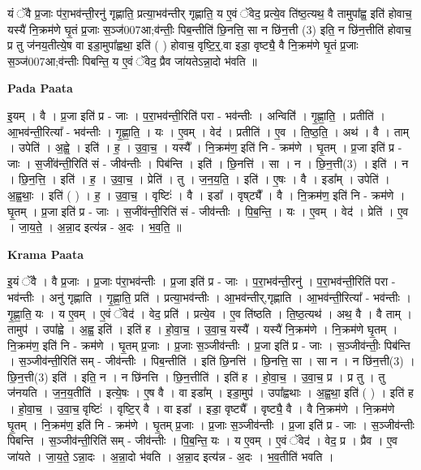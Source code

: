 \documentclass[17pt]{extarticle}
\begin{document}
यं ॅवै प्र॒जाः प॑रा॒भव॑न्ती॒रनु॑ गृह्णाति॒ प्रत्या॒भव॑न्तीर् गृह्णाति॒ य ए॒वं ॅवेद॒ प्रत्ये॒व ति॑ष्ठ॒त्यथ॒ वै तामुपा᳚ह्व॒ इति॑ होवाच॒ यस्यै॑ नि॒क्रम॑णे घृ॒तं प्र॒जाः स॒ञ्ज॑007आ;व॑न्तीः॒ पिब॒न्तीति॑ छि॒नत्ति॒ सा न छि॑न॒त्ती (3) इति॒ न छि॑न॒त्तीति॑ होवाच॒ प्र तु ज॑नय॒तीत्ये॒ष वा इडा॒मुपा᳚ह्वथा॒ इति॑ ( ) होवाच॒ वृष्टि॒र्॒.वा इडा॒ वृष्ट्यै॒ वै नि॒क्रम॑णे घृ॒तं प्र॒जाः स॒ञ्ज॑007आ;व॑न्तीः पिबन्ति॒ य ए॒वं ॅवेद॒ प्रैव जा॑यतेऽन्ना॒दो भ॑वति ॥ \newline

\textbf{Pada Paata} \newline

इ॒यम् । वै । प्र॒जा इति॑ प्र - जाः । प॒रा॒भव॑न्ती॒रिति॑ परा - भव॑न्तीः । अन्विति॑॑ । गृ॒ह्णा॒ति॒ । प्रतीति॑ । आ॒भव॑न्ती॒रित्या᳚ - भव॑न्तीः । गृ॒ह्णा॒ति॒ । यः । ए॒वम् । वेद॑ । प्रतीति॑ । ए॒व । ति॒ष्ठ॒ति॒ । अथ॑ । वै । ताम् । उपेति॑ । अ॒ह्वे॒ । इति॑ । ह॒ । उ॒वा॒च॒ । यस्यै᳚ । नि॒क्रम॑ण॒ इति॑ नि - क्रम॑णे । घृ॒तम् । प्र॒जा इति॑ प्र - जाः । स॒जींव॑न्ती॒रिति॑ सं - जीव॑न्तीः । पिब॑न्ति । इति॑ । छि॒नत्ति॑ । सा । न । छि॒न॒त्ती(3) । इति॑ । न । छि॒न॒त्ति॒ । इति॑ । ह॒ । उ॒वा॒च॒ । प्रेति॑ । तु । ज॒न॒य॒ति॒ । इति॑ । ए॒षः । वै । इडा᳚म् । उपेति॑ । अ॒ह्व॒थाः॒ । इति॑ ( ) । ह॒ । उ॒वा॒च॒ । वृष्टिः॑ । वै । इडा᳚ । वृष्‌ट्यै᳚ । वै । नि॒क्रम॑ण॒ इति॑ नि - क्रम॑णे । घृ॒तम् । प्र॒जा इति॑ प्र - जाः । स॒जींव॑न्ती॒रिति॑ सं - जीव॑न्तीः । पि॒ब॒न्ति॒ । यः । ए॒वम् । वेद॑ । प्रेति॑ । ए॒व । जा॒य॒ते॒ । अ॒न्ना॒द इत्य॑न्न - अ॒दः । भ॒व॒ति॒ ॥  \newline


\textbf{Krama Paata} \newline

इ॒यं ॅवै । वै प्र॒जाः । प्र॒जाः प॑रा॒भव॑न्तीः । प्र॒जा इति॑ प्र - जाः । प॒रा॒भव॑न्ती॒रनु॑ । प॒रा॒भव॑न्ती॒रिति॑ परा - भव॑न्तीः । अनु॑ गृह्णाति । गृ॒ह्णा॒ति॒ प्रति॑ । प्रत्या॒भव॑न्तीः । आ॒भव॑न्तीर्,गृह्णाति । आ॒भव॑न्ती॒रित्या᳚ - भव॑न्तीः । गृ॒ह्णा॒ति॒ यः । य ए॒वम् । ए॒वं ॅवेद॑ । वेद॒ प्रति॑ । प्रत्ये॒व । ए॒व ति॑ष्ठति । ति॒ष्ठ॒त्यथ॑ । अथ॒ वै । वै ताम् । तामुप॑ । उपा᳚ह्वे । अ॒ह्व॒ इति॑ । इति॑ ह । हो॒वा॒च॒ । उ॒वा॒च॒ यस्यै᳚ । यस्यै॑ नि॒क्रम॑णे । नि॒क्रम॑णे घृ॒तम् । नि॒क्रम॑ण॒ इति॑ नि - क्रम॑णे । घृ॒तम् प्र॒जाः । प्र॒जाः स॒ञ्जीव॑न्तीः । प्र॒जा इति॑ प्र - जाः । स॒ञ्जीव॑न्तीः॒ पिब॑न्ति । स॒ञ्जीव॑न्ती॒रिति॑ सम् - जीव॑न्तीः । पिब॒न्तीति॑ । इति॑ छि॒नत्ति॑ । छि॒नत्ति॒ सा । सा न । न छि॑न॒त्ती(3) । छि॒न॒त्ती(3) इति॑ । इति॒ न । न छि॑नत्ति । छि॒न॒त्तीति॑ । इति॑ ह । हो॒वा॒च॒ । उ॒वा॒च॒ प्र । प्र तु । तु ज॑नयति । ज॒न॒य॒तीति॑ । इत्ये॒षः । ए॒ष वै । वा इडा᳚म् । इडा॒मुप॑ । उपा᳚ह्वथाः । अ॒ह्व॒था॒ इति॑ ( ) । इति॑ ह । हो॒वा॒च॒ । उ॒वा॒च॒ वृष्टिः॑ । वृष्टि॒र् वै । वा इडा᳚ । इडा॒ वृष्ट्यै᳚ । वृष्ट्यै॒ वै । वै नि॒क्रम॑णे । नि॒क्रम॑णे घृ॒तम् । नि॒क्रम॑ण॒ इति॑ नि - क्रम॑णे । घृ॒तम् प्र॒जाः । प्र॒जाः स॒ञ्जीव॑न्तीः । प्र॒जा इति॑ प्र - जाः । स॒ञ्जीव॑न्तीः पिबन्ति । स॒ञ्जीव॑न्ती॒रिति॑ सम् - जीव॑न्तीः । पि॒ब॒न्ति॒ यः । य ए॒वम् । ए॒वं ॅवेद॑ । वेद॒ प्र । प्रैव । ए॒व जा॑यते । जा॒य॒ते॒ ऽन्ना॒दः । अ॒न्ना॒दो भ॑वति । अ॒न्ना॒द इत्य॑न्न - अ॒दः । भ॒व॒तीति॑ भवति । \newline
\end{document}
